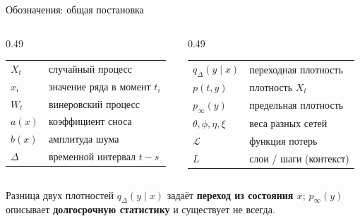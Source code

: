 \documentclass[10pt,aspectratio=169]{beamer}
\begin{document}
\begin{frame}{Обозначения: общая постановка}
\vspace{0.02cm}
{\small
\begin{columns}[T,onlytextwidth]
\begin{column}{0.49\textwidth}
\begin{tabular}{@{}p{1.45cm}p{4.7cm}@{}}
$X_t$ & случайный процесс \\[0.08cm]
$x_i$ & значение ряда в момент $t_i$ \\[0.08cm]
$W_t$ & винеровский процесс \\[0.08cm]
$a(x)$ & коэффициент сноса \\[0.08cm]
$b(x)$ & амплитуда шума \\[0.08cm]
$\Delta$ & временной интервал $t-s$
\end{tabular}
\end{column}
\begin{column}{0.49\textwidth}
\begin{tabular}{@{}p{2.0cm}p{4.1cm}@{}}
$q_\Delta(y\mid x)$ & переходная плотность \\[0.08cm]
$p(t,y)$ & плотность $X_t$ \\[0.08cm]
$p_\infty(y)$ & предельная плотность \\[0.08cm]
$\theta,\phi,\eta,\xi$ & веса разных сетей \\[0.08cm]
$\mathcal L$ & функция потерь \\[0.08cm]
$L$ & слои / шаги (контекст)
\end{tabular}
\end{column}
\end{columns}}
\vspace{0.10cm}
\begin{block}{Разница двух плотностей}
$q_\Delta(y\mid x)$ задаёт \textbf{переход из состояния $x$};
$p_\infty(y)$ описывает \textbf{долгосрочную статистику} и существует не всегда.
\end{block}
\end{frame}
\end{document}
